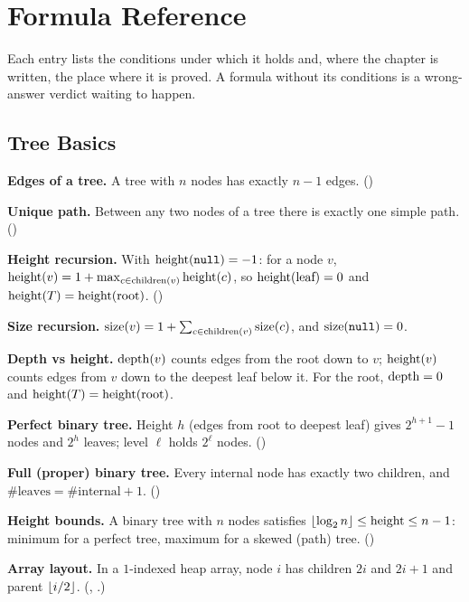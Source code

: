 \chapter{Formula Reference}\label{ch:app-formulas}

Each entry lists the conditions under which it holds and, where the chapter is
written, the place where it is proved. A formula without its conditions is a
wrong-answer verdict waiting to happen.

\section{Tree Basics}

\begin{tcolorbox}[mathbase, colback=white, colframe=primaryblue, title={Counting nodes, edges, paths (Chapter 1)}, colbacktitle=primaryblue]
\textbf{Edges of a tree.} A tree with $n$ nodes has exactly $n-1$ edges. \hfill ()

\textbf{Unique path.} Between any two nodes of a tree there is exactly one simple path. \hfill ()

\textbf{Height recursion.} With $\operatorname{height}(\texttt{null})=-1$: for a node $v$,
$\operatorname{height}(v)=1+\max_{c\in\operatorname{children}(v)}\operatorname{height}(c)$, so $\operatorname{height}(\text{leaf})=0$ and
$\operatorname{height}(T)=\operatorname{height}(\text{root})$. \hfill ()

\textbf{Size recursion.} $\operatorname{size}(v)=1+\sum_{c\in\operatorname{children}(v)}\operatorname{size}(c)$, and $\operatorname{size}(\texttt{null})=0$.

\textbf{Depth vs height.} $\operatorname{depth}(v)$ counts edges from the root down to $v$;
$\operatorname{height}(v)$ counts edges from $v$ down to the deepest leaf below it. For the root,
$\operatorname{depth}=0$ and $\operatorname{height}(T)=\operatorname{height}(\text{root})$.
\end{tcolorbox}

\begin{tcolorbox}[mathbase, colback=white, colframe=softpurple, title={Binary tree shapes (Chapter 1)}, colbacktitle=softpurple]
\textbf{Perfect binary tree.} Height $h$ (edges from root to deepest leaf) gives
$2^{h+1}-1$ nodes and $2^{h}$ leaves; level $\ell$ holds $2^{\ell}$ nodes. \hfill ()

\textbf{Full (proper) binary tree.} Every internal node has exactly two children, and
$\#\text{leaves}=\#\text{internal}+1$. \hfill ()

\textbf{Height bounds.} A binary tree with $n$ nodes satisfies
$\lfloor\log_2 n\rfloor\le \operatorname{height} \le n-1$: minimum for a perfect tree, maximum for a
skewed (path) tree. \hfill ()

\textbf{Array layout.} In a $1$-indexed heap array, node $i$ has children $2i$ and
$2i+1$ and parent $\lfloor i/2\rfloor$. (, .)
\end{tcolorbox}


